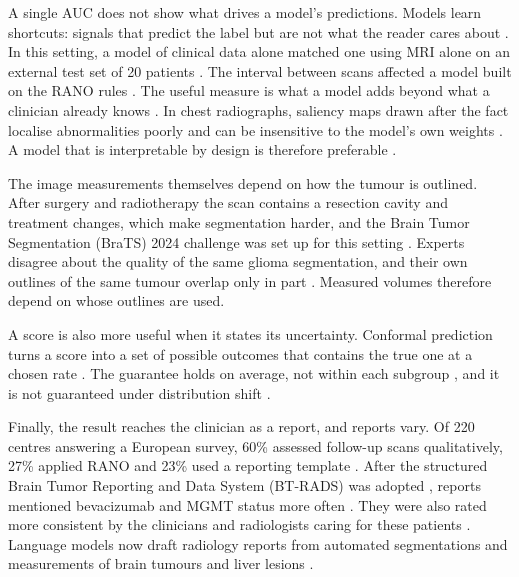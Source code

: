\documentclass[largeformat]{interact} %
\begin{document}
A single AUC does not show what drives a model's predictions. Models learn shortcuts: signals that predict the label
but are not what the reader cares about \citep{geirhos2020,zech2018,badgeley2019}. In this setting, a model of
clinical data alone matched one using MRI alone on an external test set of 20 patients \citep{gomaa2025}. The interval between scans
affected a model built on the RANO rules \citep{tarek2026}. The useful measure is what a model adds beyond what a
clinician already knows \citep{pencina2008,beaulieujones2021}. In chest radiographs, saliency maps drawn after the fact localise abnormalities poorly \citep{arun2021,saporta2022} and can be insensitive to the model's own weights
\citep{arun2021}. A model that is
interpretable by design is therefore preferable \citep{rudin2019}.

The image measurements themselves depend on how the tumour is outlined. After surgery and radiotherapy the scan contains a resection cavity and treatment changes, which make segmentation
harder, and the Brain Tumor Segmentation (BraTS) 2024 challenge was set up for this setting \citep{deverdier2024}. Experts disagree about the quality of the same glioma segmentation, and
their own outlines of the same tumour overlap only in part \citep{hoebel2024}. Measured volumes therefore depend on
whose outlines are used.

A score is also more useful when it states its uncertainty. Conformal prediction turns a score into a set of possible
outcomes that contains the true one at a chosen rate \citep{angelopoulos2023}. The guarantee holds on average, not within each subgroup \citep{barber2021limits,mehrtens2023}, and it is not guaranteed
under distribution shift \citep{mehrtens2023}.

Finally, the result reaches the clinician as a report, and reports vary. Of 220 centres answering a European survey, 60\% assessed
follow-up scans qualitatively, 27\% applied RANO and 23\% used a reporting template \citep{thust2018}. After the
structured Brain Tumor Reporting and Data System (BT-RADS) was adopted \citep{weinberg2018}, reports mentioned bevacizumab and MGMT status more often
\citep{zhang2020}. They were also rated more consistent by the clinicians and radiologists caring for these patients
\citep{gore2019}. Language models now draft radiology reports from automated segmentations and measurements of brain tumours
\citep{valerio2025,herasrivera2026} and liver lesions \citep{mansour2026}.
\end{document}
